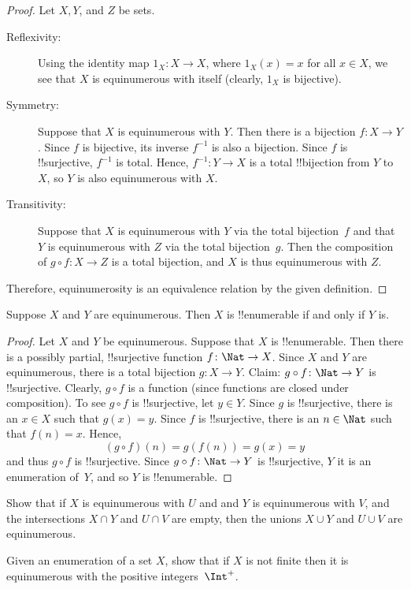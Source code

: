 \documentclass[../../include/open-logic-section]{subfiles}
\begin{document}
\begin{proof} Let $X, Y$, and $Z$ be sets.

\begin{description}

\item[Reflexivity:] Using the identity map $1_X \colon X \rightarrow
  X$, where $1_X (x) = x$ for all $x \in X$, we see
  that $X$ is equinumerous with itself (clearly, $1_X$ is bijective).

\item[Symmetry:] Suppose that $X$ is equinumerous with $Y$. Then there
  is a bijection $f\colon X \rightarrow Y$. Since $f$ is bijective,
  its inverse $f^{-1}$ is also a bijection. Since $f$ is !!{surjective},
  $f^{-1}$ is total. Hence, $f^{-1}\colon Y \rightarrow X$ is a total
  !!{bijection} from $Y$ to~$X$, so $Y$ is also equinumerous with $X$.

\item[Transitivity:] Suppose that $X$ is equinumerous with $Y$ via the
  total bijection~$f$ and that $Y$ is equinumerous with $Z$ via the
  total bijection~$g$. Then the composition of $g \circ f \colon X
  \rightarrow Z$ is a total bijection, and $X$ is thus equinumerous
  with $Z$.
\end{description}
Therefore, equinumerosity is an equivalence relation by the given definition.
\end{proof}

\begin{thm}
Suppose $X$ and $Y$ are equinumerous. Then $X$ is !!{enumerable} if
and only if $Y$ is.
\end{thm}

\begin{proof}
Let $X$ and $Y$ be equinumerous.  Suppose that $X$ is
!!{enumerable}. Then there is a possibly partial, !!{surjective}
function $f\colon \Nat \to X$. Since $X$ and $Y$ are equinumerous,
there is a total bijection $g\colon X \to Y$. Claim: $g \circ f \colon
\Nat \rightarrow Y$ is !!{surjective}. Clearly, $g \circ f$ is a
function (since functions are closed under composition). To see $g
\circ f$ is !!{surjective}, let $y \in Y$. Since $g$ is
!!{surjective}, there is an $x \in X$ such that $g(x) = y$. Since $f$
is !!{surjective}, there is an $n \in \Nat$ such that $f(n) =
x$. Hence,
\[ 
(g \circ f)(n) = g(f(n)) = g(x) = y 
\]
and thus $g \circ f$ is !!{surjective}. Since $g \circ f\colon \Nat
\to Y$ is !!{surjective}, $Y$ it is an enumeration of~$Y$, and so $Y$ is
!!{enumerable}.
\end{proof}

\begin{prob}
Show that if $X$ is equinumerous with $U$ and and $Y$ is equinumerous
with $V$, and the intersections $X \cap Y$ and $U \cap V$ are empty,
then the unions $X \cup Y$ and $U \cup V$ are equinumerous.
\end{prob}

\begin{prob}
Given an enumeration of a set $X$, show that if $X$ is not finite then
it is equinumerous with the positive integers~$\Int^+$.
\end{prob}
\end{document}
